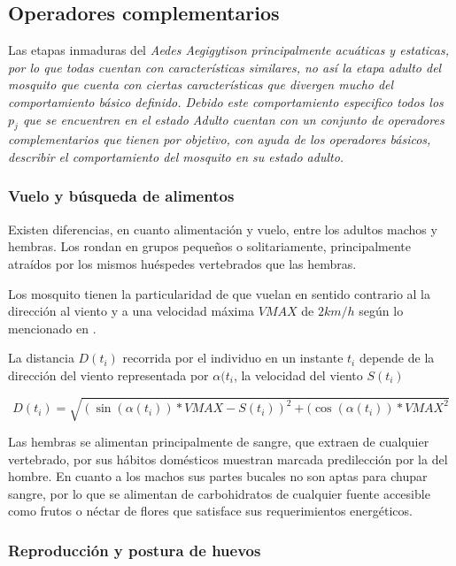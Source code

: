 
\subsection{Operadores complementarios}
Las etapas inmaduras del \em Aedes Aegigyti\em son principalmente acuáticas
y estaticas, por lo que todas cuentan con características similares, no
así la etapa adulto del mosquito que cuenta con ciertas características
que divergen mucho del comportamiento básico definido. Debido este
comportamiento especifico todos los $p_{j}$ que se encuentren en el estado
\em Adulto \em cuentan con un conjunto de operadores complementarios que
tienen por objetivo, con ayuda de los operadores básicos, describir el
comportamiento del mosquito en su estado adulto.

\subsubsection{Vuelo y búsqueda de alimentos}
Existen diferencias, en cuanto alimentación y vuelo, entre los adultos
machos y hembras. Los rondan en grupos pequeños o solitariamente,
principalmente atraídos por los mismos huéspedes vertebrados que las hembras.

Los mosquito tienen la particularidad de que vuelan en sentido contrario
al la dirección al viento y a una velocidad máxima $VMAX$ de $2 km/h$ según lo
mencionado en \cite{web-site:speedAnimals}.

La distancia $D(t_{i})$ recorrida por el individuo en un instante $t_{i}$
depende de la dirección del viento representada por $\alpha(t_{i}$, la
velocidad del viento $S(t_{i})$

\begin{equation}
 D (t_{i}) = \sqrt{{(\sin(\alpha(t_{i})) * VMAX  - S(t_{i}))}^{2}
  + {(\cos(\alpha(t_{i})) * VMAX} ^{2} }
\end{equation}

Las hembras se alimentan principalmente de sangre, que extraen de cualquier
vertebrado, por sus hábitos domésticos muestran marcada predilección por
la del hombre\cite{ThironIzcazaJ2003}. En cuanto a los machos sus partes
bucales no son aptas para chupar sangre, por lo que se alimentan de
carbohidratos de cualquier fuente accesible como frutos o néctar de flores
que satisface sus requerimientos energéticos.

\subsubsection{Reproducción y postura de huevos}
